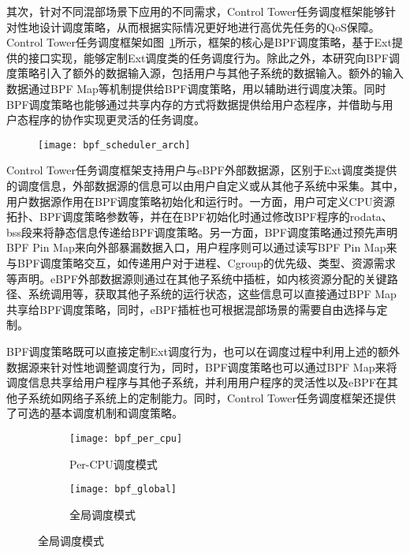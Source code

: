 其次，针对不同混部场景下应用的不同需求，Control Tower任务调度框架能够针对性地设计调度策略，从而根据实际情况更好地进行高优先任务的QoS保障。Control Tower任务调度框架如图~\ref{fig:bpf_scheduler_arch}所示，框架的核心是BPF调度策略，基于Ext提供的接口实现，能够定制Ext调度类的任务调度行为。除此之外，本研究向BPF调度策略引入了额外的数据输入源，包括用户与其他子系统的数据输入。额外的输入数据通过BPF Map等机制提供给BPF调度策略，用以辅助进行调度决策。同时BPF调度策略也能够通过共享内存的方式将数据提供给用户态程序，并借助与用户态程序的协作实现更灵活的任务调度。

\begin{figure}[H]
    \centering
    \texttt{[image: bpf\_scheduler\_arch]}
    \label{fig:bpf_scheduler_arch}
\end{figure}

Control Tower任务调度框架支持用户与eBPF外部数据源，区别于Ext调度类提供的调度信息，外部数据源的信息可以由用户自定义或从其他子系统中采集。其中，用户数据源作用在BPF调度策略初始化和运行时。一方面，用户可定义CPU资源拓扑、BPF调度策略参数等，并在在BPF初始化时通过修改BPF程序的rodata、bss段来将静态信息传递给BPF调度策略。另一方面，BPF调度策略通过预先声明BPF Pin Map来向外部暴漏数据入口，用户程序则可以通过读写BPF Pin Map来与BPF调度策略交互，如传递用户对于进程、Cgroup的优先级、类型、资源需求等声明。eBPF外部数据源则通过在其他子系统中插桩，如内核资源分配的关键路径、系统调用等，获取其他子系统的运行状态，这些信息可以直接通过BPF Map共享给BPF调度策略，同时，eBPF插桩也可根据混部场景的需要自由选择与定制。

BPF调度策略既可以直接定制Ext调度行为，也可以在调度过程中利用上述的额外数据源来针对性地调整调度行为，同时，BPF调度策略也可以通过BPF Map来将调度信息共享给用户程序与其他子系统，并利用用户程序的灵活性以及eBPF在其他子系统如网络子系统上的定制能力。同时，Control Tower任务调度框架还提供了可选的基本调度机制和调度策略。


\begin{figure}[!htbp]
    \centering
    \begin{subfigure}[b]{0.49\textwidth}
        \texttt{[image: bpf\_per\_cpu]}
        \caption{Per-CPU调度模式}
        \label{fig:bpf_per_cpu}
    \end{subfigure}
    \begin{subfigure}[b]{0.49\textwidth}
        \texttt{[image: bpf\_global]}
        \caption{全局调度模式}
        \label{fig:bpf_global}
    \end{subfigure}
\label{fig:bpf_sched_mode}
\end{figure}

